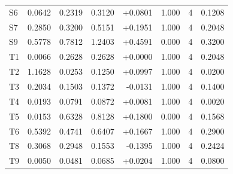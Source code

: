 \begin{table}[!htbp]
\begin{tabular}{lrrrrrrr}
S6 & 0.0642 & 0.2319 & 0.3120 & +0.0801 & 1.000 & 4 & 0.1208 \\
S7 & 0.2850 & 0.3200 & 0.5151 & +0.1951 & 1.000 & 4 & 0.2048 \\
S9 & 0.5778 & 0.7812 & 1.2403 & +0.4591 & 0.000 & 4 & 0.3200 \\
T1 & 0.0066 & 0.2628 & 0.2628 & +0.0000 & 1.000 & 4 & 0.2048 \\
T2 & 1.1628 & 0.0253 & 0.1250 & +0.0997 & 1.000 & 4 & 0.0200 \\
T3 & 0.2034 & 0.1503 & 0.1372 & -0.0131 & 1.000 & 4 & 0.1400 \\
T4 & 0.0193 & 0.0791 & 0.0872 & +0.0081 & 1.000 & 4 & 0.0020 \\
T5 & 0.0153 & 0.6328 & 0.8128 & +0.1800 & 0.000 & 4 & 0.1568 \\
T6 & 0.5392 & 0.4741 & 0.6407 & +0.1667 & 1.000 & 4 & 0.2900 \\
T8 & 0.3068 & 0.2948 & 0.1553 & -0.1395 & 1.000 & 4 & 0.2424 \\
T9 & 0.0050 & 0.0481 & 0.0685 & +0.0204 & 1.000 & 4 & 0.0800 \\
\bottomrule
\end{tabular}
\end{table}


